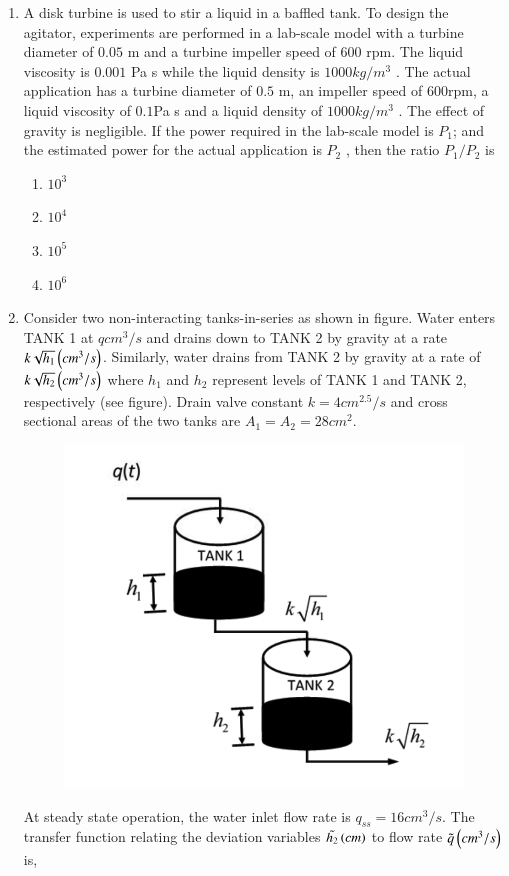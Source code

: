 \documentclass[journal,12pt,onecolumn]{IEEEtran}
\theoremstyle{remark}
\begin{document}
\begin{enumerate}
    \item A disk turbine is used to stir a liquid in a baffled tank. To design the agitator, experiments are performed in a lab-scale model with a turbine diameter of $0.05$ m and a turbine impeller speed of $600$ rpm. The liquid viscosity is $0.001$ Pa s while the liquid density is $1000 kg/m^3$ . The actual application has a turbine diameter of $0.5$ m, an impeller speed of $600$rpm, a liquid viscosity of $0.1$Pa s and a liquid density of $1000 kg/m^3$ . The effect of gravity is negligible. If the power required in the lab-scale model is $P_1$; and the estimated power for the actual application is $P_2$ , then the ratio $P_1/P_2$ is 
\begin{multicols}{4}
    \begin{enumerate}
        \item $10^3$
        \item $10^4$
        \item $10^5$
        \item $10^6$
        \end{enumerate}
\end{multicols}

    \item 
        Consider two non-interacting tanks-in-series as shown in figure. Water enters TANK 1 at $q cm^3/s$ and drains down to TANK 2 by gravity at a rate $k\sqrt{h_1}\left(cm^3/s\right)$. Similarly, water drains from TANK 2 by gravity at a rate of $k\sqrt{h_2}\left(cm^3/s\right)$ where $h_1$ and $h_2$ represent levels of TANK 1 and TANK 2, respectively (see figure). Drain valve constant $k = 4 cm^{2.5}/s$ and cross sectional areas of the two tanks are $A_1 = A_2 = 28 cm^2$.
    

\begin{figure}[H]
    \centering
    \includegraphics[width=0.4\columnwidth]{Fig/30.png}
    \caption*{}
    \label{fig: 30}
  
\end{figure}

       At steady state operation, the water inlet flow rate is $q_{ss} = 16 cm^3/s$. The transfer function relating the deviation variables $\tilde{h_2}\left(cm\right)$ to flow rate $\tilde{q}\left(cm^3/s\right)$ is,


\end{enumerate}
\end{document}
